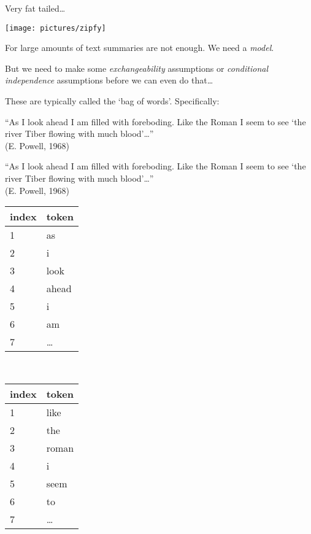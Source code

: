 \documentclass{mediumfoils}
\begin{document}
Very fat tailed\ldots


\begin{center}
\texttt{[image: pictures/zipfy]}
\end{center}



For large amounts of text summaries are not enough. We need a \textit{model}.

But we need to make some \textsl{exchangeability} assumptions or 
\textit{conditional independence} assumptions before we can even do that\ldots


These are typically called the `bag of words'.  Specifically:


``As I look ahead I am filled with foreboding.  Like the Roman I seem to see `the river Tiber flowing with much blood'\ldots ''\\
(E. Powell, 1968)



``As I look ahead I am filled with foreboding.  Like the Roman I seem to see `the river Tiber flowing with much blood'\ldots ''\\
(E. Powell, 1968)
\begin{center}
\small
\begin{tabular}{ll}\toprule
index & token\\ \midrule
1 & as\\
2 & i\\
3 & look\\
4 & ahead\\
5 & i\\
6 & am\\
7 & \ldots\\ \bottomrule
\end{tabular}
~~~~~~~~~~
\begin{tabular}{ll}\toprule
index & token\\ \midrule
1 & like\\
2 & the\\
3 & roman\\
4 & i\\
5 & seem\\
6 & to\\
7 & \ldots\\ \bottomrule
\end{tabular}
\normalsize
\end{center}
\end{document}
